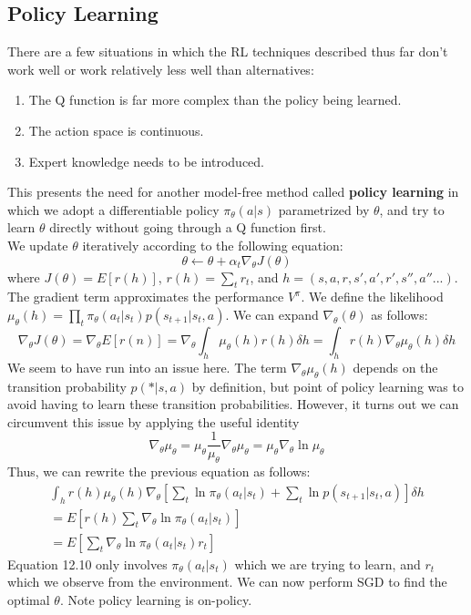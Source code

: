 \subsection{Policy Learning}
There are a few situations in which the RL techniques described thus far don't work well or work relatively less well than alternatives:
\begin{enumerate}
    \item The Q function is far more complex than the policy being learned.
    \item The action space is continuous.
    \item Expert knowledge needs to be introduced.
\end{enumerate}
This presents the need for another model-free method called \textbf{policy learning} in which we adopt a differentiable policy $\pi_\theta(a|s)$ parametrized by $\theta$, and try to learn $\theta$ directly without going through a Q function first.\\
We update $\theta$ iteratively according to the following equation:
\begin{equation*}
    \theta \leftarrow \theta + \alpha_t \nabla_\theta J(\theta)
\end{equation*}
where $J(\theta) = E[r(h)]$, $r(h) = \sum_tr_t$, and $h = (s, a, r, s', a', r', s'', a''...)$. The gradient term approximates the performance $V^{\pi}$. We define the likelihood $\mu_\theta(h) = \prod_t\pi_\theta(a_t|s_t)p(s_{t+1}|s_t, a)$. We can expand $\nabla_\theta(\theta)$ as follows:
\begin{equation}
    \nabla_\theta J(\theta) = \nabla_\theta E[r(n)] = \nabla_\theta\int_h\mu_\theta(h)r(h)\delta h = \int_hr(h)\nabla_\theta\mu_\theta(h)\delta h
\end{equation}
We seem to have run into an issue here. The term $\nabla_\theta\mu_\theta(h)$ depends on the transition probability $p(*|s, a)$ by definition, but point of policy learning was to avoid having to learn these transition probabilities. However, it turns out we can circumvent this issue by applying the useful identity
\begin{equation}
    \nabla_\theta\mu_\theta = \mu_\theta\frac{1}{\mu_\theta}\nabla_\theta\mu_\theta = \mu_\theta\nabla_\theta\ln\mu_\theta
\end{equation}
Thus, we can rewrite the previous equation as follows:
\begin{align}
    \int_hr(h)\mu_\theta(h)\nabla_\theta\left[\sum_t\ln\pi_\theta(a_t|s_t) + \sum_t\ln p(s_{t+1}|s_t, a)\right]\delta h\\
    = E\left[r(h)\sum_t\nabla_\theta\ln\pi_\theta(a_t|s_t)\right]\\
    = E\left[\sum_t\nabla_\theta\ln\pi_\theta(a_t|s_t)r_t\right]
\end{align}
Equation 12.10 only involves $\pi_\theta(a_t|s_t)$ which we are trying to learn, and $r_t$ which we observe from the environment. We can now perform SGD to find the optimal $\theta$. Note policy learning is on-policy.

